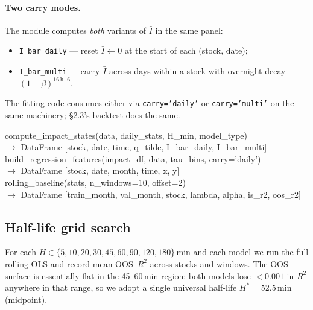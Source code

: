 \documentclass[11pt,a4paper]{article}
\begin{document}
\paragraph{Two carry modes.}  The module computes \emph{both} variants of
$\bar I$ in the same panel:
\begin{itemize}
  \item \texttt{I\_bar\_daily} --- reset $\bar I\leftarrow 0$ at the start
    of each (stock, date);
  \item \texttt{I\_bar\_multi} --- carry $\bar I$ across days within a
    stock with overnight decay $(1-\beta)^{16\,\text{h}\cdot 6}$.
\end{itemize}
The fitting code consumes either via \texttt{carry='daily'} or
\texttt{carry='multi'} on the same machinery; \S2.3's backtest does the
same.

\begin{sigbox}
\noindent
compute\_impact\_states(data, daily\_stats, H\_min, model\_type) \\
\hspace*{1em}$\rightarrow$ DataFrame [stock, date, time, q\_tilde, I\_bar\_daily, I\_bar\_multi] \\[2pt]
build\_regression\_features(impact\_df, data, tau\_bins, carry='daily') \\
\hspace*{1em}$\rightarrow$ DataFrame [stock, date, month, time, x, y] \\[2pt]
rolling\_baseline(stats, n\_windows=10, offset=2) \\
\hspace*{1em}$\rightarrow$ DataFrame [train\_month, val\_month, stock, lambda, alpha, is\_r2, oos\_r2]
\end{sigbox}

\subsection{Half-life grid search}

For each $H\in\{5,10,20,30,45,60,90,120,180\}$\,min and each model we run
the full rolling OLS and record mean OOS~$R^2$ across stocks and windows.
The OOS surface is essentially flat in the 45--60\,min region: both
models lose $<0.001$ in $R^2$ anywhere in that range, so we adopt a
single universal half-life $H^*\!=\!52.5$\,min (midpoint).
\end{document}
